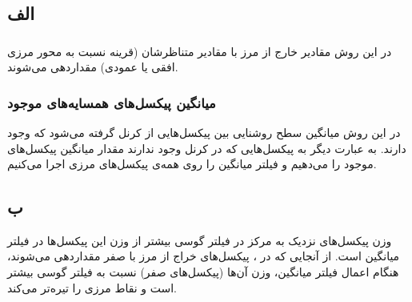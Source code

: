 \documentclass{article}
\begin{document}


\newpage


\section{}%
\subsection{الف}
\subsubsection{}
در این روش مقادیر خارج از مرز با مقادیر متناظرشان (قرینه نسبت به محور مرزی افقی یا عمودی) مقداردهی می‌شوند.
\subsubsection{میانگین پیکسل‌های همسایه‌های موجود}
در این روش میانگین سطح روشنایی بین پیکسل‌هایی از کرنل گرفته می‌شود که وجود دارند. به عبارت دیگر به پیکسل‌هایی که در کرنل وجود ندارند مقدار میانگین پیکسل‌های موجود را می‌دهیم و فیلتر میانگین را روی همه‌ی پیکسل‌های مرزی اجرا می‌کنیم.

\subsection{ب}
وزن پیکسل‌های نزدیک به مرکز در فیلتر گوسی بیشتر از وزن این پیکسل‌ها در فیلتر میانگین است. از آنجایی که در ، پیکسل‌های خراج از مرز با صفر مقداردهی می‌شوند، هنگام اعمال فیلتر میانگین، وزن آن‌ها (پیکسل‌های صفر) نسبت به فیلتر گوسی بیشتر است و نقاط مرزی را تیره‌تر می‌کند.
\end{document}
